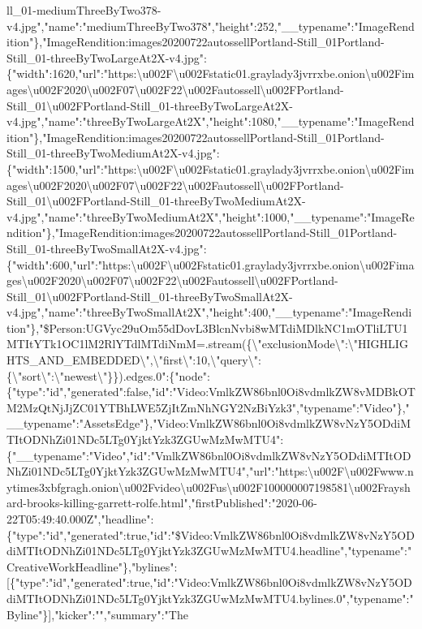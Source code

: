 ll\_01-mediumThreeByTwo378-v4.jpg","name":"mediumThreeByTwo378","height":252,"\_\_typename":"ImageRendition"\},"ImageRendition:images20200722autossellPortland-Still\_01Portland-Still\_01-threeByTwoLargeAt2X-v4.jpg":\{"width":1620,"url":"https:\textbackslash{}u002F\textbackslash{}u002Fstatic01.graylady3jvrrxbe.onion\textbackslash{}u002Fimages\textbackslash{}u002F2020\textbackslash{}u002F07\textbackslash{}u002F22\textbackslash{}u002Fautossell\textbackslash{}u002FPortland-Still\_01\textbackslash{}u002FPortland-Still\_01-threeByTwoLargeAt2X-v4.jpg","name":"threeByTwoLargeAt2X","height":1080,"\_\_typename":"ImageRendition"\},"ImageRendition:images20200722autossellPortland-Still\_01Portland-Still\_01-threeByTwoMediumAt2X-v4.jpg":\{"width":1500,"url":"https:\textbackslash{}u002F\textbackslash{}u002Fstatic01.graylady3jvrrxbe.onion\textbackslash{}u002Fimages\textbackslash{}u002F2020\textbackslash{}u002F07\textbackslash{}u002F22\textbackslash{}u002Fautossell\textbackslash{}u002FPortland-Still\_01\textbackslash{}u002FPortland-Still\_01-threeByTwoMediumAt2X-v4.jpg","name":"threeByTwoMediumAt2X","height":1000,"\_\_typename":"ImageRendition"\},"ImageRendition:images20200722autossellPortland-Still\_01Portland-Still\_01-threeByTwoSmallAt2X-v4.jpg":\{"width":600,"url":"https:\textbackslash{}u002F\textbackslash{}u002Fstatic01.graylady3jvrrxbe.onion\textbackslash{}u002Fimages\textbackslash{}u002F2020\textbackslash{}u002F07\textbackslash{}u002F22\textbackslash{}u002Fautossell\textbackslash{}u002FPortland-Still\_01\textbackslash{}u002FPortland-Still\_01-threeByTwoSmallAt2X-v4.jpg","name":"threeByTwoSmallAt2X","height":400,"\_\_typename":"ImageRendition"\},"\$Person:UGVyc29uOm55dDovL3BlcnNvbi8wMTdiMDlkNC1mOTliLTU1MTItYTk1OC1lM2RlYTdlMTdiNmM=.stream(\{\textbackslash{}"exclusionMode\textbackslash{}":\textbackslash{}"HIGHLIGHTS\_AND\_EMBEDDED\textbackslash{}",\textbackslash{}"first\textbackslash{}":10,\textbackslash{}"query\textbackslash{}":\{\textbackslash{}"sort\textbackslash{}":\textbackslash{}"newest\textbackslash{}"\}\}).edges.0":\{"node":\{"type":"id","generated":false,"id":"Video:VmlkZW86bnl0Oi8vdmlkZW8vMDBkOTM2MzQtNjJjZC01YTBhLWE5ZjItZmNhNGY2NzBiYzk3","typename":"Video"\},"\_\_typename":"AssetsEdge"\},"Video:VmlkZW86bnl0Oi8vdmlkZW8vNzY5ODdiMTItODNhZi01NDc5LTg0YjktYzk3ZGUwMzMwMTU4":\{"\_\_typename":"Video","id":"VmlkZW86bnl0Oi8vdmlkZW8vNzY5ODdiMTItODNhZi01NDc5LTg0YjktYzk3ZGUwMzMwMTU4","url":"https:\textbackslash{}u002F\textbackslash{}u002Fwww.nytimes3xbfgragh.onion\textbackslash{}u002Fvideo\textbackslash{}u002Fus\textbackslash{}u002F100000007198581\textbackslash{}u002Frayshard-brooks-killing-garrett-rolfe.html","firstPublished":"2020-06-22T05:49:40.000Z","headline":\{"type":"id","generated":true,"id":"\$Video:VmlkZW86bnl0Oi8vdmlkZW8vNzY5ODdiMTItODNhZi01NDc5LTg0YjktYzk3ZGUwMzMwMTU4.headline","typename":"CreativeWorkHeadline"\},"bylines":{[}\{"type":"id","generated":true,"id":"Video:VmlkZW86bnl0Oi8vdmlkZW8vNzY5ODdiMTItODNhZi01NDc5LTg0YjktYzk3ZGUwMzMwMTU4.bylines.0","typename":"Byline"\}{]},"kicker":"","summary":"The
